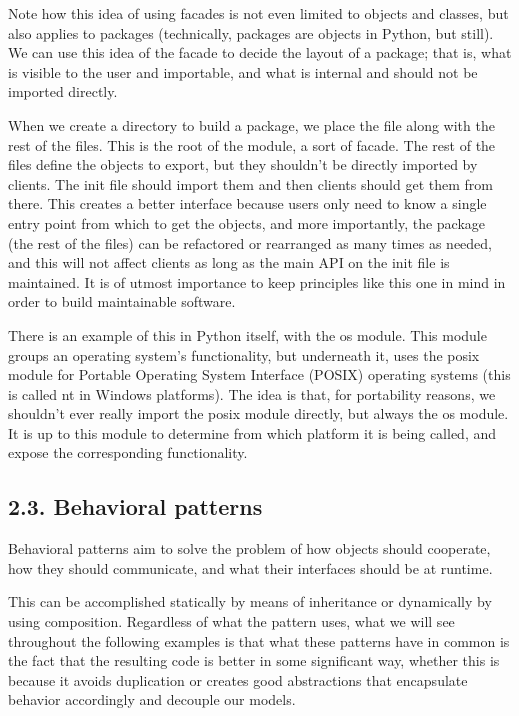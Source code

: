 \documentclass[a4paper,10pt,english]{sphinxmanual}
\begin{document}
Note how this idea of using facades is not even limited to objects and classes, but also
applies to packages (technically, packages are objects in Python, but still). We can use this
idea of the facade to decide the layout of a package; that is, what is visible to the user and
importable, and what is internal and should not be imported directly.

When we create a directory to build a package, we place the  file along with
the rest of the files. This is the root of the module, a sort of facade. The rest of the files
define the objects to export, but they shouldn’t be directly imported by clients. The init file
should import them and then clients should get them from there. This creates a better
interface because users only need to know a single entry point from which to get the
objects, and more importantly, the package (the rest of the files) can be refactored or
rearranged as many times as needed, and this will not affect clients as long as the main API
on the init file is maintained. It is of utmost importance to keep principles like this one in
mind in order to build maintainable software.

There is an example of this in Python itself, with the os module. This module groups an
operating system’s functionality, but underneath it, uses the posix module for Portable
Operating System Interface (POSIX) operating systems (this is called nt in Windows
platforms). The idea is that, for portability reasons, we shouldn’t ever really import
the posix module directly, but always the os module. It is up to this module to determine
from which platform it is being called, and expose the corresponding functionality.


\subsection{2.3. Behavioral patterns}
\label{\detokenize{chapters/9_design_patterns/index:behavioral-patterns}}
Behavioral patterns aim to solve the problem of how objects should cooperate, how they
should communicate, and what their interfaces should be at run\sphinxhyphen{}time.

This can be accomplished statically by means of inheritance or dynamically by using
composition. Regardless of what the pattern uses, what we will see throughout the
following examples is that what these patterns have in common is the fact that the resulting
code is better in some significant way, whether this is because it avoids duplication or
creates good abstractions that encapsulate behavior accordingly and decouple our models.
\end{document}
